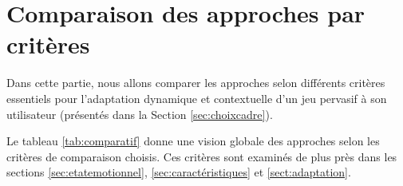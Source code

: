 \documentclass{article}
\begin{document}
\section{Comparaison des approches par critères}\label{sec:comparaisonapp}
    Dans cette partie, nous allons comparer les approches selon différents critères essentiels pour l'adaptation dynamique et contextuelle d'un jeu pervasif à son utilisateur (présentés dans la Section \ref{sec:choixcadre}). \par
    Le tableau \ref{tab:comparatif} donne une vision globale des approches selon les critères de comparaison choisis. Ces critères sont examinés de plus près dans les sections \ref{sec:etatemotionnel}, \ref{sec:caractéristiques} et \ref{sect:adaptation}.
\end{document}
